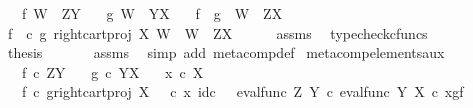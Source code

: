 \begin{isabellebody}
\ \ \ {\isachardoublequoteopen}f{\isacharcolon}{\kern0pt}\ W\ {\isasymrightarrow}\ Z\isactrlbsup Y\isactrlesup {\isachardoublequoteclose}\isanewline
\ \ \ {\isachardoublequoteopen}g{\isacharcolon}{\kern0pt}\ W\ {\isasymrightarrow}\ Y\isactrlbsup X\isactrlesup {\isachardoublequoteclose}\isanewline
\ \ \ {\isachardoublequoteopen}f\ {\isasymbox}\ g\ {\isacharcolon}{\kern0pt}\ W\ {\isasymrightarrow}\ Z\isactrlbsup X\isactrlesup {\isachardoublequoteclose}\isanewline
%
\isadelimproof
%
\endisadelimproof
%
\isatagproof
{}\isamarkupfalse%
\ {\isacharminus}{\kern0pt}\ \isanewline
\ \ \isamarkupfalse%
\ {\isachardoublequoteopen}{\isacharparenleft}{\kern0pt}f\isactrlsup {\isasymflat}\ \ {\isasymcirc}\isactrlsub c\ {\isasymlangle}g\isactrlsup {\isasymflat}{\isacharcomma}{\kern0pt}\ right{\isacharunderscore}{\kern0pt}cart{\isacharunderscore}{\kern0pt}proj\ X\ W{\isasymrangle}{\isacharparenright}{\kern0pt}\isactrlsup {\isasymsharp}\ {\isacharcolon}{\kern0pt}\ W\ {\isasymrightarrow}\ Z\isactrlbsup X\isactrlesup {\isachardoublequoteclose}\isanewline
\ \ \ \ \isamarkupfalse%
\ assms\ \isamarkupfalse%
\ typecheck{\isacharunderscore}{\kern0pt}cfuncs\isanewline
\ \ \isamarkupfalse%
\ \isamarkupfalse%
\ {\isacharquery}{\kern0pt}thesis\ \isanewline
\ \ \ \ \isamarkupfalse%
\ assms\ \isamarkupfalse%
\ {\isacharparenleft}{\kern0pt}simp\ add{\isacharcolon}{\kern0pt}\ meta{\isacharunderscore}{\kern0pt}comp{}{\isacharunderscore}{\kern0pt}def{}{\isacharparenright}{\kern0pt}\isanewline
{}\isamarkupfalse%
%
\endisatagproof
{\isafoldproof}%
%
\isadelimproof
\isanewline
%
\endisadelimproof
\isanewline
{}\isamarkupfalse%
\ meta{\isacharunderscore}{\kern0pt}comp{}{\isacharunderscore}{\kern0pt}elements{\isacharunderscore}{\kern0pt}aux{\isacharcolon}{\kern0pt}\ \isanewline
\ \ \ {\isachardoublequoteopen}f\ {\isasymin}\isactrlsub c\ Z\isactrlbsup Y\isactrlesup {\isachardoublequoteclose}\isanewline
\ \ \ {\isachardoublequoteopen}g\ {\isasymin}\isactrlsub c\ Y\isactrlbsup X\isactrlesup {\isachardoublequoteclose}\isanewline
\ \ \ {\isachardoublequoteopen}x\ {\isasymin}\isactrlsub c\ X{\isachardoublequoteclose}\isanewline
\ \ \ {\isachardoublequoteopen}{\isacharparenleft}{\kern0pt}f\isactrlsup {\isasymflat}\ {\isasymcirc}\isactrlsub c\ {\isasymlangle}g\isactrlsup {\isasymflat}{\isacharcomma}{\kern0pt}right{\isacharunderscore}{\kern0pt}cart{\isacharunderscore}{\kern0pt}proj\ X\ {\isasymone}{\isasymrangle}{\isacharparenright}{\kern0pt}\ \ {\isasymcirc}\isactrlsub c\ {\isasymlangle}x{\isacharcomma}{\kern0pt}\ id\isactrlsub c\ {\isasymone}{\isasymrangle}\ {\isacharequal}{\kern0pt}\ eval{\isacharunderscore}{\kern0pt}func\ Z\ Y\ {\isasymcirc}\isactrlsub c\ {\isasymlangle}eval{\isacharunderscore}{\kern0pt}func\ Y\ X\ {\isasymcirc}\isactrlsub c\ {\isasymlangle}x{\isacharcomma}{\kern0pt}g{\isasymrangle}{\isacharcomma}{\kern0pt}f{\isasymrangle}{\isachardoublequoteclose}\isanewline

\end{isabellebody}
